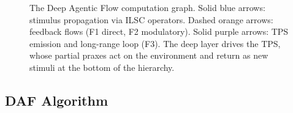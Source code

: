 \documentclass[12pt,a4paper]{article}
\begin{document}
\begin{figure}[h!]
\caption{The Deep Agentic Flow computation graph. Solid blue arrows: stimulus
propagation via ILSC operators. Dashed orange arrows: feedback flows (F1 direct,
F2 modulatory). Solid purple arrows: TPS emission and long-range loop (F3).
The deep layer drives the TPS, whose partial praxes act on the environment
and return as new stimuli at the bottom of the hierarchy.}
\label{fig:daf_graph}
\end{figure}

\subsection{DAF Algorithm}
\end{document}
